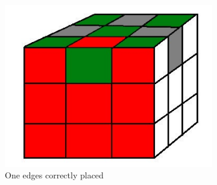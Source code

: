 \documentclass[a4paper,11pt]{kth-mag}
\begin{document}
\begin{figure}[bh]
\begin{subfigure}[!b]{0.3\textwidth}
		\includegraphics[width=\textwidth]{figs/last-edge-correct.jpg}
		\caption{One edges correctly placed}
		\label{fig_14}
	\end{subfigure}
	\caption{}
\end{figure}
\end{document}

